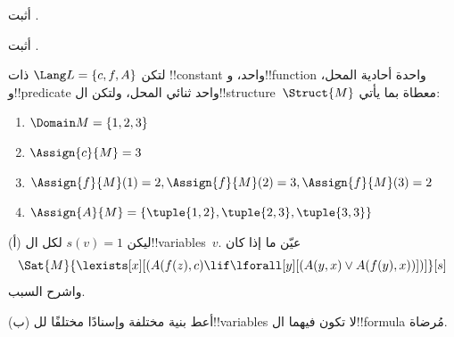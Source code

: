 \documentclass[../../../include/open-logic-section]{subfiles}
\begin{document}

\begin{prob}
  أثبت .
\end{prob}
\tagendprob


\begin{prob}
  أثبت .
\end{prob}
\tagendprob

\begin{prob}
لتكن $\Lang L = \{c, f, A\}$ ذات !!{constant} واحد، و!!{function}
واحدة أحادية المحل، و!!{predicate} واحد ثنائي المحل، ولتكن
ال!!{structure}~$\Struct{M}$ معطاة بما يأتي:
\begin{enumerate}
\item $\Domain M = \{1, 2, 3\}$
\item $\Assign{c}{M} = 3$
\item $\Assign{f}{M}(1) = 2, \Assign{f}{M}(2) = 3, \Assign{f}{M}(3) = 2$
\item $\Assign{A}{M} = \{\tuple{1, 2}, \tuple{2, 3}, \tuple{3, 3}\}$
\end{enumerate}
(أ) ليكن $s(v) = 1$ لكل ال!!{variable}s~$v$. عيّن ما إذا كان
\[
\Sat{M}{\lexists[x][(A(f(z), c) \lif \lforall[y][(A(y, x) \lor A(f(y),
      x))])]}[s]
\]
واشرح السبب.

(ب) أعط بنية مختلفة وإسنادًا مختلفًا لل!!{variable}s لا تكون فيهما
ال!!{formula} مُرضاة.
\end{prob}
\end{document}
